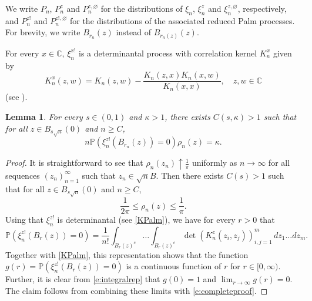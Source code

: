 \documentclass{amsart}
\theoremstyle{plain}
\newtheorem{lemma}[theorem]{Lemma}
\theoremstyle{definition}
\theoremstyle{remark}
\def\P{\mathbb P}
\begin{document}
 We write $P_n$, $P_n^{z}$ and $P_n^{z, \varnothing}$ for the distributions of $\xi_n$, $\xi_n^{z}$ and $\xi_n^{z,\varnothing}$, respectively, and $P_n^{z!}$ and $P_n^{z!, \varnothing}$ for the distributions of the associated reduced Palm processes. For brevity, we write $B_{r_n}(z)$ instead of $B_{r_n(z)}(z)$.
 
 For every $x\in \mathbb{C}$,  $\xi_n^{x!}$ is a  determinantal process with correlation kernel $K_n^x$ given by
\begin{equation}
	K_n^x(z,w)=K_n(z,w)-\frac{K_n(z,x)K_n(x,w)}{K_n(x,x)},\quad z,w \in \mathbb C \label{KPalm}
\end{equation} 
(see \cite[Theorem 1.7]{ST03}). 


\begin{lemma}\label{l:requality}
For every $s \in (0,1)$ and $\kappa >1$, there exists $C(s, \kappa)>1$ such that for all $z \in B_{s \sqrt{n}}(0)$ and $n \ge C$, 
\begin{equation}
n \P(\xi_n^{z!}(B_{r_n}(z))=0) \rho_n(z) = \kappa.
\end{equation}
\end{lemma}
\begin{proof}
It is straightforward to see that $  \rho_n( z_n) \uparrow \frac 1 \pi$ uniformly as $n \to \infty$ for all sequences $(z_n)_{n=1}^\infty$ such that $z_n \in \sqrt{n}B$. Then there exists $C(s) > 1$ such that for all $z \in B_{s \sqrt{n}}(0)$ and $n \ge C$, 
\begin{equation}\label{e:completeproof}
	\frac 1{2\pi  } \le \rho_n(z) \le \frac 1{\pi }. 
\end{equation}
Using that $\xi^{z!}_n$ is determinantal (see \eqref{KPalm}), we have for every $r>0$ that 
\begin{equation}\label{e:integralrep}
\mathbb P(\xi^{z!}_n(B_r(z) )=0)
=
\frac{1}{n!}
\int_{B_r(z)^c}\dots \int_{B_r(z)^c} \det (K^z_n (z_i,z_j))_{i,j=1}^m  \, dz_1\dots dz_m.
\end{equation}
Together with \eqref{KPalm}, this representation shows that the function $g(r) = \P(\xi^{z!}_n(B_r(z) )=0)$ is a continuous function of $r$ for $r \in [0, \infty)$. Further, it is clear from \eqref{e:integralrep} that $g(0) = 1$ and $ \lim_{r \rightarrow \infty} g(r) = 0$. The claim follows from combining these limits with \eqref{e:completeproof}.
\end{proof}
\end{document}
